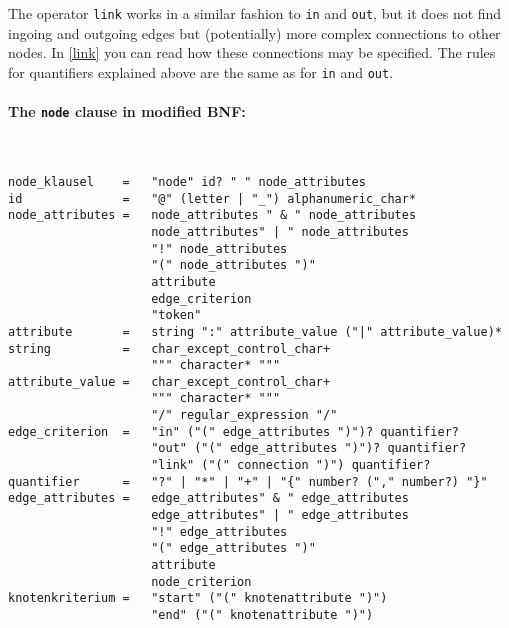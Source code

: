 \documentclass[12pt]{scrartcl}
\begin{document}
The operator \texttt{link} works in a similar fashion to \texttt{in} and \texttt{out}, but it does not find ingoing and outgoing edges but (potentially) more complex connections to other nodes.
In \ref{link} you can read how these connections may be specified.
The rules for quantifiers explained above are the same as for \texttt{in} and \texttt{out}.


\paragraph*{The \texttt{node} clause in modified BNF:}
~
\begin{framed}
\begin{lstlisting}
node_klausel    =   "node" id? " " node_attributes
id              =   "@" (letter | "_") alphanumeric_char*
node_attributes =   node_attributes " & " node_attributes
                    node_attributes" | " node_attributes
                    "!" node_attributes
                    "(" node_attributes ")"
                    attribute
                    edge_criterion
                    "token"
attribute       =   string ":" attribute_value ("|" attribute_value)*
string          =   char_except_control_char+
                    """ character* """
attribute_value =   char_except_control_char+
                    """ character* """
                    "/" regular_expression "/"
edge_criterion  =   "in" ("(" edge_attributes ")")? quantifier?
                    "out" ("(" edge_attributes ")")? quantifier?
                    "link" ("(" connection ")") quantifier?
quantifier      =   "?" | "*" | "+" | "{" number? ("," number?) "}"
edge_attributes =   edge_attributes" & " edge_attributes
                    edge_attributes" | " edge_attributes
                    "!" edge_attributes
                    "(" edge_attributes ")"
                    attribute
                    node_criterion
knotenkriterium =   "start" ("(" knotenattribute ")")
                    "end" ("(" knotenattribute ")")
\end{lstlisting}
\end{framed}
\end{document}
